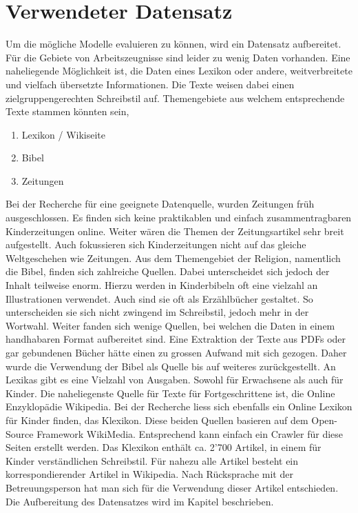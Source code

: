\section{Verwendeter Datensatz}
\label{sec:verwendeter_datensatz}
Um die mögliche Modelle evaluieren zu können, wird ein Datensatz aufbereitet. Für die Gebiete von Arbeitszeugnisse sind
leider zu wenig Daten vorhanden. Eine naheliegende Möglichkeit ist, die Daten eines Lexikon oder andere, weitverbreitete
und vielfach übersetzte Informationen. Die Texte weisen dabei einen zielgruppengerechten Schreibstil auf.
\newline
\newline
Themengebiete aus welchem entsprechende Texte stammen könnten sein,
\begin{enumerate}
	\setlength\itemsep{0em}
	\item Lexikon / Wikiseite
	\item Bibel
	\item Zeitungen
\end{enumerate}
\noindent
Bei der Recherche für eine geeignete Datenquelle, wurden Zeitungen früh ausgeschlossen. Es finden sich keine
praktikablen und einfach zusammentragbaren Kinderzeitungen online. Weiter wären die Themen der Zeitungsartikel sehr
breit aufgestellt. Auch fokussieren sich Kinderzeitungen nicht auf das gleiche Weltgeschehen wie Zeitungen.
\newline
\newline
Aus dem Themengebiet der Religion, namentlich \flqq die Bibel\frqq, finden sich zahlreiche Quellen. Dabei unterscheidet
sich jedoch der Inhalt teilweise enorm. Hierzu werden in Kinderbibeln oft eine vielzahl an Illustrationen verwendet.
Auch sind sie oft als Erzählbücher gestaltet. So unterscheiden sie sich nicht zwingend im Schreibstil, jedoch mehr in
der Wortwahl. Weiter fanden sich wenige Quellen, bei welchen die Daten in einem handhabaren Format aufbereitet sind.
Eine Extraktion der Texte aus PDFs oder gar gebundenen Bücher hätte einen zu grossen Aufwand mit sich gezogen. Daher
wurde die Verwendung der Bibel als Quelle bis auf weiteres zurückgestellt.
\newline
\newline
An Lexikas gibt es eine Vielzahl von Ausgaben. Sowohl für Erwachsene als auch für Kinder. Die naheliegenste Quelle für
Texte für Fortgeschrittene ist, die Online Enzyklopädie \flqq Wikipedia\frqq. Bei der Recherche liess sich ebenfalls ein
Online Lexikon für Kinder finden, das \flqq Klexikon\frqq. Diese beiden Quellen basieren auf dem Open-Source Framework
\flqq WikiMedia\frqq. Entsprechend kann einfach ein Crawler für diese Seiten erstellt werden. Das Klexikon enthält ca.
2'700 Artikel, in einem für Kinder verständlichen Schreibstil. Für nahezu alle Artikel besteht ein korrespondierender
Artikel in Wikipedia. Nach Rücksprache mit der Betreuungsperson hat man sich für die Verwendung dieser Artikel
entschieden. Die Aufbereitung des Datensatzes wird im Kapitel  beschrieben.

